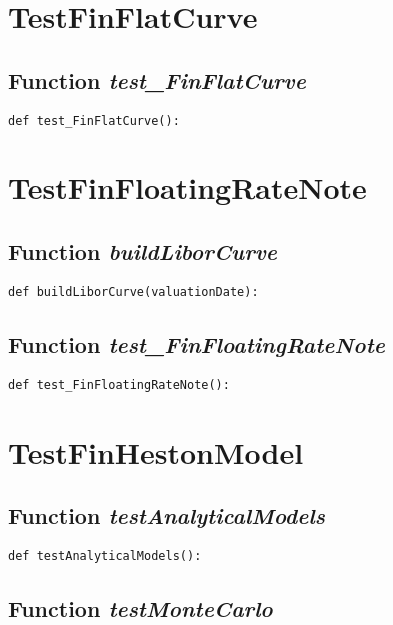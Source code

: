 \documentclass[twoside,11pt]{book}
\begin{document}
\newpage
\section{TestFinFlatCurve}

\subsection{Function {\it test\_FinFlatCurve}}


\begin{lstlisting}
def test_FinFlatCurve():
\end{lstlisting}


\newpage
\section{TestFinFloatingRateNote}

\subsection{Function {\it buildLiborCurve}}


\begin{lstlisting}
def buildLiborCurve(valuationDate):
\end{lstlisting}

\subsection{Function {\it test\_FinFloatingRateNote}}


\begin{lstlisting}
def test_FinFloatingRateNote():
\end{lstlisting}


\newpage
\section{TestFinHestonModel}

\subsection{Function {\it testAnalyticalModels}}


\begin{lstlisting}
def testAnalyticalModels():
\end{lstlisting}

\subsection{Function {\it testMonteCarlo}}
\end{document}
